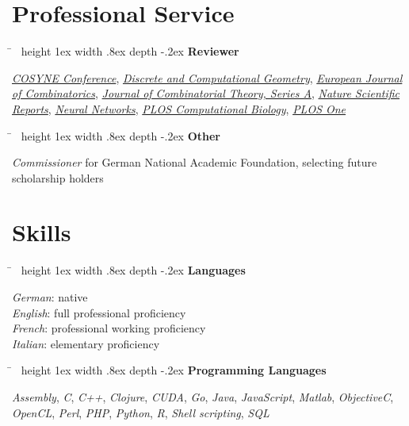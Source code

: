 \documentclass[10pt]{article} %
\newlength{\smallertextwidth}
\newcommand{\sqbullet}{~\vrule height 1ex width .8ex depth -.2ex} %
\newcommand{\skillgroup}[2]{
\begin{tabbing}
\hspace{5mm} \= \kill
\sqbullet \>\+ \textbf{#1}\\
\begin{minipage}{\smallertextwidth}
\vspace{5pt}
#2
\end{minipage}
\end{tabbing}
}
\begin{document}

\vspace*{-2mm}
\section{Professional Service}
%
\skillgroup{Reviewer}
{
\textit{\href{http://www.cosyne.org}{COSYNE Conference}},
\textit{\href{https://link.springer.com/journal/454}{Discrete and Computational Geometry}},
\textit{\href{https://www.journals.elsevier.com/european-journal-of-combinatorics}{European Journal of Combinatorics}},
\textit{\href{https://www.journals.elsevier.com/journal-of-combinatorial-theory-series-a}{Journal of Combinatorial Theory, Series A}},
\textit{\href{https://www.nature.com/srep/}{Nature Scientific Reports}},
\textit{\href{https://www.journals.elsevier.com/neural-networks}{Neural Networks}},
\textit{\href{https://journals.plos.org/ploscompbiol/}{PLOS Computational Biology}},
\textit{\href{https://journals.plos.org/plosone/}{PLOS One}}
}

\skillgroup{Other}
{
  \textit{Commissioner} for German National Academic Foundation, selecting future scholarship holders
}


\section{Skills}

\skillgroup{Languages}
{
  \textit{German}: native\\
  \textit{English}: full professional proficiency\\
  \textit{French}: professional working proficiency\\
  \textit{Italian}: elementary proficiency\\
}



\skillgroup{Programming Languages}
{
\textit{Assembly}, \textit{C}, \textit{C++},
\textit{Clojure},
\textit{CUDA},
\textit{Go},
\textit{Java},
\textit{JavaScript},
\textit{Matlab},
\textit{ObjectiveC},
\textit{OpenCL},
\textit{Perl},
\textit{PHP},
\textit{Python},
\textit{R},
\textit{Shell scripting},
\textit{SQL}
}
\end{document}
